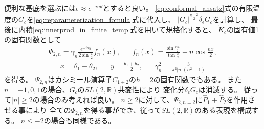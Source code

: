 便利な基底を選ぶには$\epsilon \approx e^{-in\theta}$とすると良い。
\eqref{eq:conformal_ansatz}式の有限温度の$G_c$を\eqref{eq:reparameterization_fomula}式に代入し、
$|G_c|^{\frac{q-2}{2}}\delta_{\epsilon}G_c$を計算し、
最後に内積\eqref{eq:innerprod_in_finite_temp}式を用いて規格化すると、
$\tilde{K}_c$の固有値1の固有関数として
\begin{align}
	\Psi_{2,n} = \gamma_n\frac{e^{-iny}}{2\sin\frac{x}{2}}f_n(x),\hspace{20pt}
	f_n(x) = \frac{\sin\frac{nx}{2}}{\tan\frac{x}{2}} - n\cos\frac{nx}{2},
	\label{eq:eigenfunc_with_eigenvalue_1}
\end{align}
\begin{align}
	x = \theta_1 - \theta_2,\hspace{20pt}
	y = \frac{\theta_1 + \theta_2}{2},\hspace{20pt}
	\gamma_n^2 = \frac{3}{\pi^2|n|(n^2 - 1)}
	\label{eq:x_y_squaregamma}
\end{align}
を得る。
$\Psi_{2,n}$はカシミール演算子$C_{1+2}$の$h=2$の固有関数でもある。
また$n=-1,0,1$の場合、$G_c$の$SL(2,\mathbb{R})$共変性により
変化分$\delta_{\epsilon}G_c$は消滅する。
従って$|n| \geq 2$の場合のみ考えれば良い。
$n \geq 2$に対して、$\Psi_{2,n=2}$に$\hat{P}_1 + \hat{P}_2$を作用させる事により
全ての$\Psi_{2,n}$を得る事ができ、従って$SL(2,\mathbb{R})$のある表現を構成する。
$n \leq -2$の場合も同様である。

